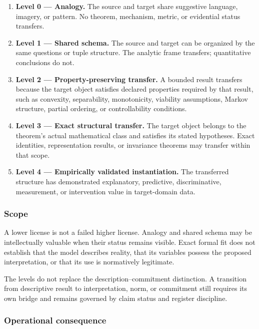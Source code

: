 \documentclass[
  11pt,
]{article}
\providecommand{\tightlist}{%
  \setlength{\itemsep}{0pt}\setlength{\parskip}{0pt}}
\begin{document}
\begin{enumerate}
\def\labelenumi{\arabic{enumi}.}
\tightlist
\item
  \textbf{Level 0 --- Analogy.} The source and target share suggestive
  language, imagery, or pattern. No theorem, mechanism, metric, or
  evidential status transfers.
\item
  \textbf{Level 1 --- Shared schema.} The source and target can be
  organized by the same questions or tuple structure. The analytic frame
  transfers; quantitative conclusions do not.
\item
  \textbf{Level 2 --- Property-preserving transfer.} A bounded result
  transfers because the target object satisfies declared properties
  required by that result, such as convexity, separability,
  monotonicity, viability assumptions, Markov structure, partial
  ordering, or controllability conditions.
\item
  \textbf{Level 3 --- Exact structural transfer.} The target object
  belongs to the theorem's actual mathematical class and satisfies its
  stated hypotheses. Exact identities, representation results, or
  invariance theorems may transfer within that scope.
\item
  \textbf{Level 4 --- Empirically validated instantiation.} The
  transferred structure has demonstrated explanatory, predictive,
  discriminative, measurement, or intervention value in target-domain
  data.
\end{enumerate}

\subsubsection{Scope}\label{scope-8}

A lower license is not a failed higher license. Analogy and shared
schema may be intellectually valuable when their status remains visible.
Exact formal fit does not establish that the model describes reality,
that its variables possess the proposed interpretation, or that its use
is normatively legitimate.

The levels do not replace the description--commitment distinction. A
transition from descriptive result to interpretation, norm, or
commitment still requires its own bridge and remains governed by claim
status and register discipline.

\subsubsection{Operational
consequence}\label{operational-consequence-10}
\end{document}
